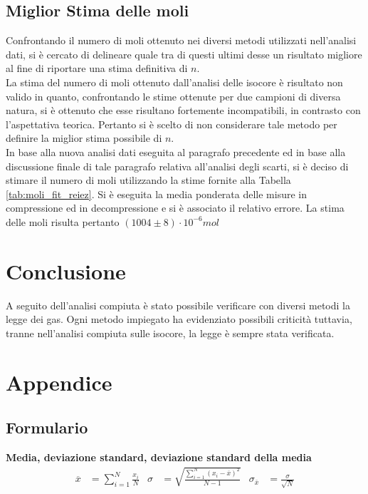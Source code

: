 \documentclass[a4paper,11pt,oneside]{article}
\begin{document}
\subsection{Miglior Stima delle moli}
Confrontando il numero di moli ottenuto nei diversi metodi utilizzati nell'analisi dati, si è cercato di delineare quale tra di questi ultimi desse un risultato migliore al fine di riportare una stima definitiva di $n$.\\
La stima del numero di moli ottenuto dall'analisi delle isocore è risultato non valido in quanto, confrontando le stime ottenute per due campioni di diversa natura, si è ottenuto che esse risultano fortemente incompatibili, in contrasto con l'aspettativa teorica. Pertanto si è scelto di non considerare tale metodo per definire la miglior stima possibile di $n$.\\
In base alla nuova analisi dati eseguita al paragrafo precedente ed in base alla discussione finale di tale paragrafo relativa all'analisi degli scarti, si è deciso di stimare il numero di moli utilizzando la stime fornite alla Tabella \ref{tab:moli_fit_reiez}. Si è eseguita la media ponderata delle misure in compressione ed in decompressione e si è associato il relativo errore. La stima delle moli risulta pertanto $(1004\pm8)\cdot10^{-6} \si{mol}$



\section{Conclusione}
A seguito dell'analisi compiuta è stato possibile verificare con diversi metodi la legge dei gas. Ogni metodo impiegato ha evidenziato possibili criticità tuttavia, tranne nell'analisi compiuta sulle isocore, la legge è sempre stata verificata.  


\section{Appendice}
\subsection{Formulario}
\textbf{Media, deviazione standard, deviazione standard della media}
\begin{align*}
        \overline{x}&=\sum\limits_{i=1}^{N} \frac{x_{i}}{N}&
        \sigma&=\sqrt{\frac{\sum\limits_{i=1}^{N} (x_{i}-\overline{x})^2}{N-1}}&
        \sigma_{\overline{x}}&=\frac{\sigma}{\sqrt{N}}
\end{align*}\\
\end{document}
